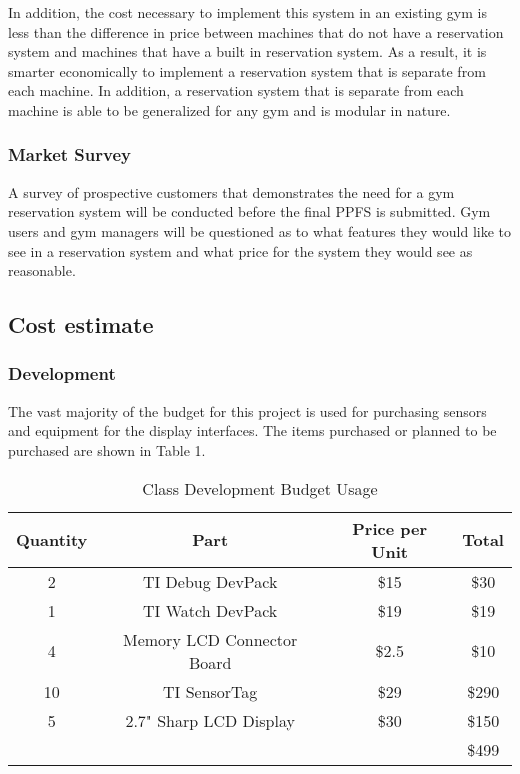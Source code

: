 \documentclass[PPFS.tex]{template/subfiles}
\begin{document}
        In addition, the cost necessary to implement this system in an existing gym is less than the difference in price between machines that do not have a reservation system and machines that have a built in reservation system. As a result, it is smarter economically to implement a reservation system that is separate from each machine. In addition, a reservation system that is separate from each machine is able to be generalized for any gym and is modular in nature.%
        
        \subsubsection{Market Survey}
        
        A survey of prospective customers that demonstrates the need for a gym reservation system will be conducted before the final PPFS is submitted. Gym users and gym managers will be questioned as to what features they would like to see in a reservation system and what price for the system they would see as reasonable.
        
        
    \subsection{Cost estimate}
        \subsubsection{Development}
        The vast majority of the budget for this project is used for purchasing sensors and equipment for the display interfaces. The items purchased or planned to be purchased are shown in Table 1.
        \begin{table}[h!]
        	\begin{center}
        		\caption{Class Development Budget Usage}
        		\label{tab:table1}
        		\begin{tabular}{|c|c|c|c|}
        			\hline
        			Quantity & Part & Price per Unit & Total\\
        			\hline
        			2 & TI Debug DevPack & \$15 & \$30\\
        			\hline
        			1 & TI Watch DevPack & \$19 & \$19\\
        			\hline
        			4 & Memory LCD Connector Board & \$2.5 & \$10\\
        			\hline
        			10 & TI SensorTag & \$29 & \$290\\
        			\hline
        			5 & 2.7" Sharp LCD Display & \$30 & \$150\\
        			\hline
        			&&& \$499\\
        			\hline
        		\end{tabular}
        	\end{center}
        \end{table}
        
\end{document}
